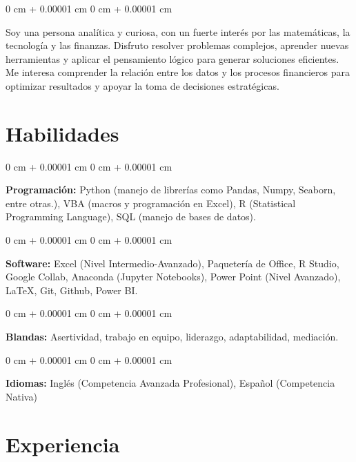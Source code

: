 \documentclass[10pt, letterpaper]{article}
\newenvironment{onecolentry}{
    \begin{adjustwidth}{
        0 cm + 0.00001 cm
    }{
        0 cm + 0.00001 cm
    }
}{
    \end{adjustwidth}
} %
\begin{document}
        \begin{onecolentry}
            Soy una persona analítica y curiosa, con un fuerte interés por las matemáticas, la tecnología y las finanzas. Disfruto resolver problemas complejos, aprender nuevas herramientas y aplicar el pensamiento lógico para generar soluciones eficientes. Me interesa comprender la relación entre los datos y los procesos financieros para optimizar resultados y apoyar la toma de decisiones estratégicas.
        \end{onecolentry}

    \section{Habilidades}

        \begin{onecolentry}
            \textbf{Programación:} Python (manejo de librerías como Pandas, Numpy, Seaborn, entre otras.), VBA (macros y programación en Excel), R (Statistical Programming Language), SQL (manejo de bases de datos). 
        \end{onecolentry}
        

        \vspace{0.2 cm}

        \begin{onecolentry}
            \textbf{Software:} Excel (Nivel Intermedio-Avanzado), Paquetería de Office, R Studio, Google Collab, Anaconda (Jupyter Notebooks), Power Point (Nivel Avanzado), LaTeX, Git, Github, Power BI.
        \end{onecolentry}

        \vspace{0.2 cm}

        \begin{onecolentry}
            \textbf{Blandas:} Asertividad, trabajo en equipo, liderazgo, adaptabilidad, mediación.
        \end{onecolentry}

        \vspace{0.2 cm}

        \begin{onecolentry}
            \textbf{Idiomas:} Inglés (Competencia Avanzada Profesional), Español (Competencia Nativa)
        \end{onecolentry}

    \section{Experiencia}
        
\end{document}
